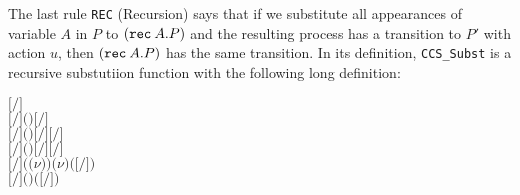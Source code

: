 The last rule \texttt{REC} (Recursion)
 says that if we substitute all appearances of variable $A$ in $P$ to
$({\tt rec}\: A . P)$ and the resulting process has a transition to $P'$
with action $u$, then $({\tt rec}\: A . P)$ has the same
transition. In its definition, \texttt{CCS_Subst} is a recursive substutiion function
with the following long definition:
\begin{alltt}
\ensuremath{[}\ensuremath{/}\ensuremath{]}  \HOLSymConst{\HOLTokenDefEquality{}} 
\ensuremath{[}\ensuremath{/}\ensuremath{]} \ensuremath{(}\HOLSymConst{\ensuremath{\ldotp}}\ensuremath{)} \HOLSymConst{\HOLTokenDefEquality{}} \HOLSymConst{\ensuremath{\ldotp}}\ensuremath{[}\ensuremath{/}\ensuremath{]} 
\ensuremath{[}\ensuremath{/}\ensuremath{]} \ensuremath{(} \HOLSymConst{\ensuremath{+}} \ensuremath{)} \HOLSymConst{\HOLTokenDefEquality{}} \ensuremath{[}\ensuremath{/}\ensuremath{]}  \HOLSymConst{\ensuremath{+}} \ensuremath{[}\ensuremath{/}\ensuremath{]} 
\ensuremath{[}\ensuremath{/}\ensuremath{]} \ensuremath{(} \HOLSymConst{\ensuremath{\mid}} \ensuremath{)} \HOLSymConst{\HOLTokenDefEquality{}} \ensuremath{[}\ensuremath{/}\ensuremath{]}  \HOLSymConst{\ensuremath{\mid}} \ensuremath{[}\ensuremath{/}\ensuremath{]} 
\ensuremath{[}\ensuremath{/}\ensuremath{]} \ensuremath{(}\ensuremath{(\nu}\ensuremath{)} \ensuremath{)} \HOLSymConst{\HOLTokenDefEquality{}} \ensuremath{(\nu}\ensuremath{)} \ensuremath{(}\ensuremath{[}\ensuremath{/}\ensuremath{]} \ensuremath{)}
\ensuremath{[}\ensuremath{/}\ensuremath{]} \ensuremath{(}  \ensuremath{)} \HOLSymConst{\HOLTokenDefEquality{}}  \ensuremath{(}\ensuremath{[}\ensuremath{/}\ensuremath{]} \ensuremath{)} 

\end{alltt}
